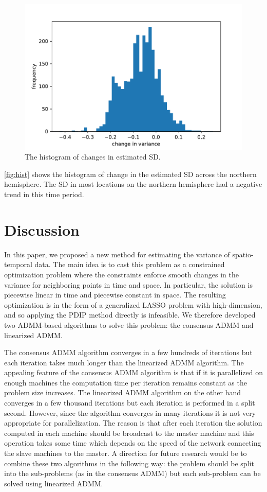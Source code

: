 \documentclass{article}
\begin{document}
\begin{figure}[tb]
  \centering
  \includegraphics[width=.3\linewidth]{Figures/hist_avg_change.pdf}
  \caption{The histogram of changes in estimated SD.}
  \label{fig:hist}
\end{figure}

\autoref{fig:hist} shows the
histogram of change in the estimated SD across the northern
hemisphere. The SD in most locations on the northern
hemisphere had a negative trend in this time period.  





 

\section{Discussion}
In this paper, we proposed a new method for estimating the variance of
spatio-temporal data. The main idea is to cast this problem as a
constrained optimization problem where the constraints enforce smooth
changes in the variance for neighboring points in time and space. In
particular, the solution is piecewise linear in time and piecewise
constant in space. The resulting optimization is in the form of a
generalized LASSO problem with high-dimension, and so applying the
PDIP method directly is infeasible. We therefore developed two
ADMM-based algorithms to solve this problem: the consensus ADMM and
linearized ADMM. 

The consensus ADMM algorithm converges in a few hundreds of iterations
but each iteration takes much longer than the linearized ADMM
algorithm. The appealing feature of the consensus ADMM algorithm is
that if it is parallelized on enough machines the
computation time per iteration remains constant as the problem size
increases. The linearized ADMM algorithm on the other hand converges
in a few thousand iterations but each iteration is performed in a
split second. However, since the algorithm converges in many
iterations it is not very appropriate for parallelization. The reason
is that after each iteration the solution computed in each machine
should be broadcast to the master machine and this operation takes
some time which depends on the speed of the network connecting the
slave machines to the master. A direction for future research would be
to combine these two algorithms in the following way: the problem
should be split into the sub-problems (as in the consensus ADMM) but
each sub-problem can be solved using linearized ADMM. 
\end{document}
